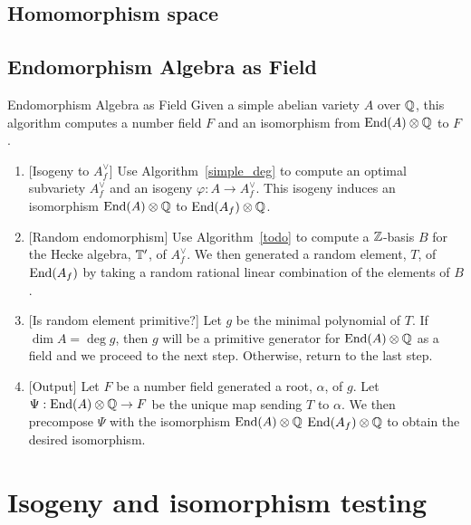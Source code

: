 \subsection{Homomorphism space}%
\label{sub:_hom_a_b_}

\subsection{Endomorphism Algebra as Field}%
\label{sub:endomorphism_algebra_as_field}

\begin{algorithm}{Endomorphism Algebra as Field}
    Given a simple abelian variety $A$ over $\mathbb{Q}$, this algorithm computes a
    number field $F$ and an isomorphism from $\operatorname{End}(A)\otimes \mathbb{Q}$ to $F$.
    \begin{enumerate}
        \item{} [Isogeny to $A_f ^\vee$]
            Use Algorithm~\ref{simple_deg} to compute an optimal subvariety
            $A_f ^\vee$ and an isogeny $\varphi:A\to A_f ^\vee$. This isogeny
            induces an isomorphism $\operatorname{End}(A)\otimes\mathbb{Q}$ to $\operatorname{End}(A_f)\otimes
            \mathbb{Q}$.
        \item{} [Random endomorphism]
            Use Algorithm~\ref{todo} to compute a $\mathbb{Z}$-basis $B$ for the Hecke
            algebra, $\mathbb{T}'$, of $A_f ^\vee$. We then generated a random
            element, $T$, of $\operatorname{End}(A_f)$ by taking a random rational linear
            combination of the elements of $B$.
        \item{} [Is random element primitive?]
            Let $g$ be the minimal polynomial of $T$. If $\dim A = \deg g$,
            then $g$ will be a primitive generator for $\operatorname{End}(A)\otimes \mathbb{Q}$ as
            a field and we proceed to the next step. Otherwise, return to the
            last step.
        \item{} [Output]
            Let $F$ be a number field generated a root, $\alpha$, of $g$. Let
            $\Psi:\operatorname{End}(A)\otimes \mathbb{Q}\to F$ be the unique map sending $T$ to
            $\alpha$. We then precompose $\Psi$ with the isomorphism
            $\operatorname{End}(A)\otimes \mathbb{Q}$ \to $\operatorname{End}(A_f)\otimes \mathbb{Q}$ to obtain the
            desired isomorphism.
    \end{enumerate}
\end{algorithm}



\section{Isogeny and isomorphism testing}


